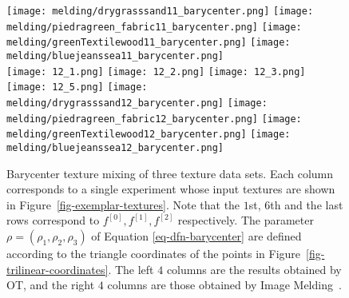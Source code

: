 \begin{figure}[ht!]
{    \hspace{2mm}
    \texttt{[image: melding/drygrasssand11\_barycenter.png]}
    \texttt{[image: melding/piedragreen\_fabric11\_barycenter.png]}
    \texttt{[image: melding/greenTextilewood11\_barycenter.png]}
    \texttt{[image: melding/bluejeanssea11\_barycenter.png]}
 \\
\vspace{1mm}
    \texttt{[image: 12\_1.png]}
    \texttt{[image: 12\_2.png]}
    \texttt{[image: 12\_3.png]}
    \texttt{[image: 12\_5.png]}
    \hspace{2mm}
    \texttt{[image: melding/drygrasssand12\_barycenter.png]}
    \texttt{[image: melding/piedragreen\_fabric12\_barycenter.png]}
    \texttt{[image: melding/greenTextilewood12\_barycenter.png]}
    \texttt{[image: melding/bluejeanssea12\_barycenter.png]}
    \\
}
\caption{Barycenter texture mixing of three texture data sets.
    Each column corresponds to a single experiment whose input textures are shown in Figure~\ref{fig-exemplar-textures}.
    Note that the $1$st, $6$th and the last rows correspond to $f^{[0]},f^{[1]},f^{[2]}$ respectively.
    The parameter $\rho=(\rho_1,\rho_2,\rho_3)$ of Equation \ref{eq-dfn-barycenter} are defined according to the triangle coordinates of the points in Figure~\ref{fig-trilinear-coordinates}.
    The left $4$ columns are the results obtained by OT, and the right $4$ columns are those obtained by Image Melding~\cite{ImageMelding12}. }
\label{fig-OT-barycenter-SST}
\end{figure}

